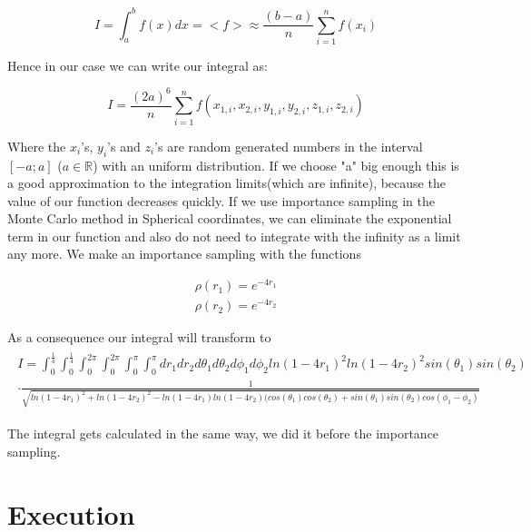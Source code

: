 \documentclass[10pt,a4paper]{article}
\begin{document}
\begin{equation}
	I = \int_{a}^{b} f(x) dx = <f> \approx \frac{(b-a)}{n} \sum_{i=1}^{n} f(x_i)
\end{equation}

Hence in our case we can write our integral as:

\begin{equation}
	I = \frac{(2a)^6}{n} \sum_{i = 1}^n f(x_{1,i}, x_{2,i}, y_{1,i}, y_{2,i}, z_{1,i}, z_{2,i})
\end{equation}

Where the $x_i$'s, $y_i$'s and $z_i$'s are random generated numbers in the interval $[-a;a]$ ($a \in \mathbb{R}$) with an uniform distribution. If we choose "a" big enough this is a good approximation to the integration limits(which are infinite), because the value of our function decreases quickly. 
If we use importance sampling in the Monte Carlo method in Spherical coordinates, we can eliminate the exponential term in our function and also do not need to integrate with the infinity as a limit any more. We make an importance sampling with the functions

\begin{align}
	\rho(r_1) = e^{-4 r_1} \\\rho(r_2) = e^{-4 r_2}
\end{align}

As a consequence our integral will transform to 
\begin{align}
	\begin{split}
		I = \int_0^\frac{1}{4} \int_0^\frac{1}{4}  \int_0^{2 \pi} \int_0^{2 \pi}  \int_0^\pi \int_0^\pi dr_1 dr_2 d\theta_1 d\theta_2 d\phi_1 d\phi_2    ln(1-4 r_1)^2 ln(1-4 r_2)^2 sin(\theta_1) sin(\theta_2)\\ \cdot \frac{1} {\sqrt{ln(1-4 r_1)^2+ln(1-4 r_2)^2-ln(1-4 r_1)ln(1-4 r_2)(cos(\theta_1)cos(\theta_2)+sin(\theta_1)sin(\theta_2)cos(\phi_1-\phi_2)}}
	\end{split}
\end{align}

The integral gets calculated in the same way, we did it before the importance sampling.

\section{Execution}
\end{document}
